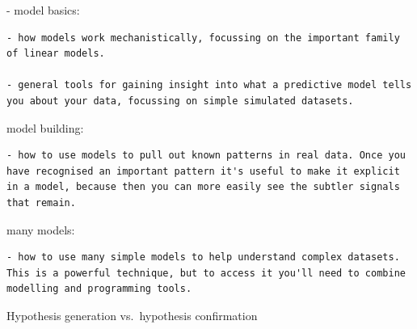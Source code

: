 \documentclass[
]{book}
\begin{document}
- model basics:

\begin{verbatim}
- how models work mechanistically, focussing on the important family of linear models.

- general tools for gaining insight into what a predictive model tells you about your data, focussing on simple simulated datasets.
\end{verbatim}

model building:

\begin{verbatim}
- how to use models to pull out known patterns in real data. Once you have recognised an important pattern it's useful to make it explicit in a model, because then you can more easily see the subtler signals that remain.
\end{verbatim}

many models:

\begin{verbatim}
- how to use many simple models to help understand complex datasets. This is a powerful technique, but to access it you'll need to combine modelling and programming tools.
\end{verbatim}

Hypothesis generation vs.~hypothesis confirmation
\end{document}
